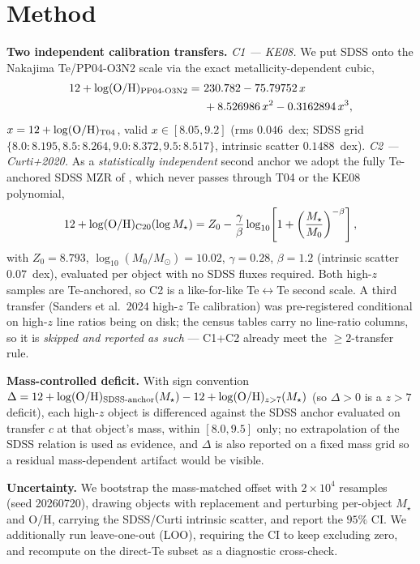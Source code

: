 \documentclass[twocolumn]{aastex631}
\begin{document}
\section{Method}\label{sec:method}
\textbf{Two independent calibration transfers.} \emph{C1 --- KE08.} We put SDSS onto the Nakajima Te/PP04-O3N2 scale via the exact \citet{KewleyEllison2008} metallicity-dependent cubic,
\begin{align}
12+\log(\mathrm{O/H})_{\rm PP04\text{-}O3N2} =\ & 230.782 - 75.79752\,x \nonumber\\
 & + 8.526986\,x^2 - 0.3162894\,x^3,
\end{align}
$x=12+\log(\mathrm{O/H})_{\rm T04}$, valid $x\in[8.05,9.2]$ (rms $0.046$~dex; SDSS grid $\{8.0{:}8.195, 8.5{:}8.264, 9.0{:}8.372, 9.5{:}8.517\}$, intrinsic scatter $0.1488$~dex). \emph{C2 --- Curti+2020.} As a \emph{statistically independent} second anchor we adopt the fully Te-anchored SDSS MZR of \citet{Curti2020}, which never passes through T04 or the KE08 polynomial,
\begin{equation}
12+\log(\mathrm{O/H})_{\rm C20}(\log M_\star) = Z_0 - \frac{\gamma}{\beta}\log_{10}\!\left[1+\left(\frac{M_\star}{M_0}\right)^{-\beta}\right],
\end{equation}
with $Z_0=8.793$, $\log_{10}(M_0/M_\odot)=10.02$, $\gamma=0.28$, $\beta=1.2$ (intrinsic scatter $0.07$~dex), evaluated per object with no SDSS fluxes required. Both high-$z$ samples are Te-anchored, so C2 is a like-for-like Te$\leftrightarrow$Te second scale. A third transfer (Sanders et al.\ 2024 high-$z$ Te calibration) was pre-registered conditional on high-$z$ line ratios being on disk; the census tables carry no line-ratio columns, so it is \emph{skipped and reported as such} --- C1+C2 already meet the $\geq2$-transfer rule.

\textbf{Mass-controlled deficit.} With sign convention $\Delta = 12+\log(\mathrm{O/H})_{\rm SDSS\text{-}anchor}(M_\star) - 12+\log(\mathrm{O/H})_{z>7}(M_\star)$ (so $\Delta>0$ is a $z>7$ deficit), each high-$z$ object is differenced against the SDSS anchor evaluated on transfer $c$ at that object's mass, within $[8.0,9.5]$ only; no extrapolation of the SDSS relation is used as evidence, and $\Delta$ is also reported on a fixed mass grid so a residual mass-dependent artifact would be visible.

\textbf{Uncertainty.} We bootstrap the mass-matched offset with $2\times10^4$ resamples (seed 20260720), drawing objects with replacement and perturbing per-object $M_\star$ and $\mathrm{O/H}$, carrying the SDSS/Curti intrinsic scatter, and report the $95\%$ CI. We additionally run leave-one-out (LOO), requiring the CI to keep excluding zero, and recompute on the direct-Te subset as a diagnostic cross-check.
\end{document}
